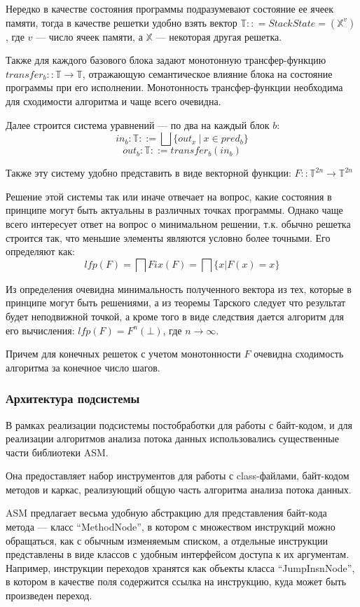 Нередко в качестве состояния программы подразумевают состояние ее ячеек памяти, тогда в качестве
решетки удобно взять вектор $\mathbb{T} :: = StackState = (\mathbb{X}^v)$, где $v$ --- число ячеек
памяти, а $\mathbb{X}$ --- некоторая другая решетка.

Также для каждого базового блока задают монотонную трансфер-функцию
$transfer_b :: \mathbb{T} \to \mathbb{T}$, отражающую семантическое влияние блока на состояние программы
при его исполнении.
Монотонность трансфер-функции необходима для сходимости алгоритма и чаще всего очевидна.

Далее строится система уравнений --- по два на каждый блок $b$:
$$in_b: \mathbb{T} ::= \bigsqcup \{out_x\ |\ x \in pred_b\}$$
$$out_b: \mathbb{T} ::= transfer_b(in_b)$$

Также эту систему удобно представить в виде векторной функции: $F :: \mathbb{T}^{2n} \to \mathbb{T}^{2n}$

Решение этой системы так или иначе отвечает на вопрос, какие состояния в принципе могут быть
актуальны в различных точках программы.
Однако чаще всего интересует ответ на вопрос о минимальном решении, т.к. обычно решетка строится
так, что меньшие элементы являются условно более точными.
Его определяют как:
$$lfp(F) = \bigsqcap Fix(F) =  \bigsqcap\{ x | F(x)= x\}$$

Из определения очевидна минимальность полученного вектора из тех, которые в принципе могут быть
решениями, а из теоремы Тарского следует что результат будет неподвижной точкой, а кроме
того в виде следствия дается алгоритм для его вычисления: $lfp(F) = F^n(\bot)$, где $n \to \infty$.

Причем для конечных решеток с учетом монотонности $F$ очевидна сходимость алгоритма за конечное
число шагов.

\subsubsection{Архитектура подсистемы}
В рамках реализации подсистемы постобработки для работы с байт-кодом, и для реализации алгоритмов
анализа потока данных использовались существенные части библиотеки ASM.

Она предоставляет набор инструментов для работы с class-файлами, байт-кодом методов и каркас,
реализующий общую часть алгоритма анализа потока данных.

ASM предлагает весьма удобную абстракцию для представления байт-кода метода --- класс
``MethodNode'', в котором с множеством инструкций можно обращаться, как с обычным изменяемым
списком, а отдельные инструкции представлены в виде классов с удобным интерфейсом доступа
к их аргументам. Например, инструкции переходов хранятся как объекты класса ``JumpInsnNode'',
в котором в качестве поля содержится ссылка на инструкцию, куда может быть произведен переход.

